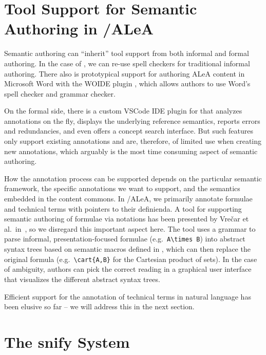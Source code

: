 \documentclass[runningheads]{llncs}
\def\edited#1{#1}
\newcommand\ALeA{\textsf{ALeA}\xspace}
\newcommand\snify{\textsf{snify}\xspace}
\newcommand\WOIDE{\textsf{WOIDE}\xspace}
\begin{document}
\section{Tool Support for Semantic Authoring in \sTeX/\ALeA}\label{sec:tools}

Semantic authoring can ``inherit'' tool support from both informal and formal authoring.
In the case of \sTeX, we can re-use spell checkers for traditional informal authoring.
There also is prototypical support for authoring \ALeA content in Microsoft Word with
the \WOIDE plugin \cite{KohKoh:woide24}, which allows authors to use Word's spell
checker and grammar checker.

On the formal side, there is a custom VSCode IDE plugin for \sTeX \cite{sTeX-IDE:git} that
analyzes annotations on the fly, displays the underlying reference semantics, reports
errors and redundancies, and even offers a concept search interface.  But such features
only support existing annotations and are, therefore, of limited use when creating new
annotations, which arguably is the most time consuming aspect of semantic authoring.

How the annotation process can be supported depends on the particular semantic framework,
the specific annotations we want to support, and the semantics embedded in the content
commons.  In \sTeX/\ALeA, we primarily annotate formulae and technical terms with pointers
to their definienda.  A tool for supporting semantic authoring of formulae via notations
has been presented by Vre{\v{c}}ar et al.\ in~\cite{VreWelKam:tsmmdui24},
\edited{so we disregard this important aspect here.
The tool} uses a grammar to parse informal, presentation-focused formulae (e.g.\
\lstinline[keywordstyle={}]|A\times B|) into abstract syntax trees based on semantic
macros defined in \sTeX, which can then replace the original formula (e.g.\
\lstinline|\cart{A,B}| for the Cartesian product of sets).  In the case of ambiguity,
authors can pick the correct reading in a graphical user interface that visualizes the
different abstract syntax trees.

Efficient support for the annotation of technical terms in natural language
has been elusive so far -- we will address this in the next section.


\section{The \snify System}\label{sec:snify}
\end{document}
